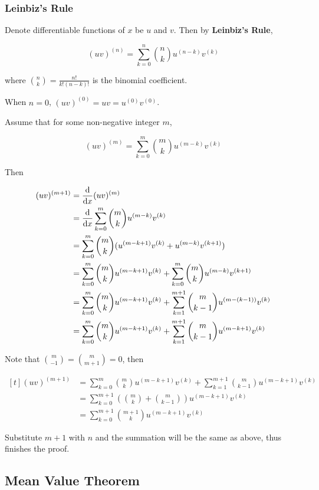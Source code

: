 \documentclass[a4paper,12pt]{article}
\begin{document}
\subsubsection{Leinbiz's Rule}
\begin{thm}
  Denote differentiable functions of $x$ be $u$ and $v$. Then by \textbf{Leinbiz's Rule},

  $$(uv)^{(n)}=\sum_{k=0}^{n}\binom{n}{k}u^{(n-k)}v^{(k)}$$\s

  where $\binom{n}{k}=\frac{n!}{k!(n-k)!}$ is the binomial coefficient.\n

  \prf When $n=0$, $(uv)^{(0)}=uv=u^{(0)}v^{(0)}$.\n

  Assume that for some non-negative integer $m$,

  $$(uv)^{(m)}=\sum_{k=0}^{m}\binom{m}{k}u^{(m-k)}v^{(k)}$$\s

  Then

  $$\begin{aligned}[t]
    (uv)^{(m+1)}&=\frac{\mathrm{d} }{\mathrm{d}  x}(uv)^{(m)}\\
    &=\frac{\mathrm{d} }{\mathrm{d}  x}\sum_{k=0}^{m}\binom{m}{k}u^{(m-k)}v^{(k)}\\
    &=\sum_{k=0}^{m}\binom{m}{k}(u^{(m-k+1)}v^{(k)}+u^{(m-k)}v^{(k+1)})\\
    &=\sum_{k=0}^{m}\binom{m}{k}u^{(m-k+1)}v^{(k)}+\sum_{k=0}^{m}\binom{m}{k}u^{(m-k)}v^{(k+1)}\\
    &=\sum_{k=0}^{m}\binom{m}{k}u^{(m-k+1)}v^{(k)}+\sum_{k=1}^{m+1}\binom{m}{k-1}u^{(m-(k-1))}v^{(k)}\\
    &=\sum_{k=0}^{m}\binom{m}{k}u^{(m-k+1)}v^{(k)}+\sum_{k=1}^{m+1}\binom{m}{k-1}u^{(m-k+1)}v^{(k)}
  \end{aligned}$$\s

  Note that $\binom{m}{-1}=\binom{m}{m+1}=0$, then

  $$\begin{aligned}[t]
    (uv)^{(m+1)}&=\sum_{k=0}^{m}\binom{m}{k}u^{(m-k+1)}v^{(k)}+\sum_{k=1}^{m+1}\binom{m}{k-1}u^{(m-k+1)}v^{(k)}\\
    &=\sum_{k=0}^{m+1}\left( \binom{m}{k}+\binom{m}{k-1}\right) u^{(m-k+1)}v^{(k)}\\
    &=\sum_{k=0}^{m+1}\binom{m+1}{k}u^{(m-k+1)}v^{(k)}
  \end{aligned}$$\s

  Substitute $m+1$ with $n$ and the summation will be the same as above, thus finishes the proof.
\end{thm}

\subsection{Mean Value Theorem}
\end{document}
